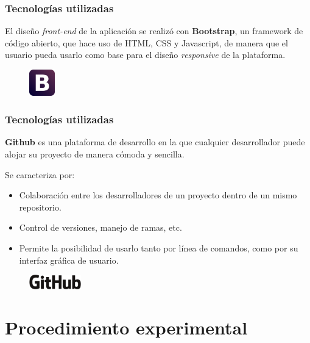 \documentclass{beamer}
\begin{document}
\begin{frame}
\frametitle{Tecnologías utilizadas}

El diseño \textit{front-end} de la aplicación se realizó con \textbf{Bootstrap}, un framework de código abierto, que hace uso de HTML, CSS y Javascript, de manera que el usuario pueda usarlo como base
para el diseño \textit{responsive} de la plataforma.

\begin{figure}
    \includegraphics[width=0.1\textwidth]{img/logo_bootstrap.eps}
\end{figure}

\end{frame}

\begin{frame}
\frametitle{Tecnologías utilizadas}

\textbf{Github} es una plataforma de desarrollo en la que cualquier desarrollador puede alojar su proyecto de manera cómoda y sencilla.

Se caracteriza por:
\begin{itemize}
    \item Colaboración entre los desarrolladores de un proyecto dentro de un mismo repositorio.
    \item Control de versiones, manejo de ramas, etc.
    \item Permite la posibilidad de usarlo tanto por línea de comandos, como por su interfaz gráfica de usuario.
\end{itemize}

\begin{figure}
    \includegraphics[width=0.2\textwidth]{img/logo_github.eps}
\end{figure}

\end{frame}

\section{Procedimiento experimental}
\end{document}
